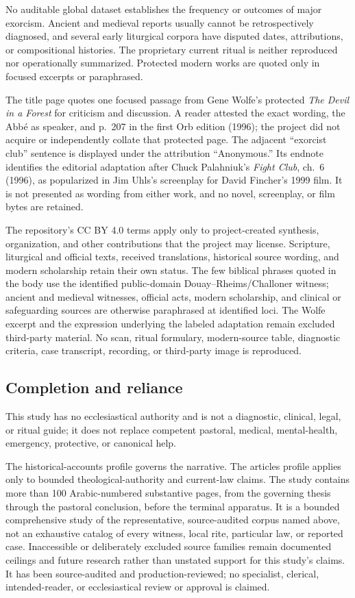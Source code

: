 No auditable global dataset establishes the frequency or outcomes of major
exorcism. Ancient and medieval reports usually cannot be retrospectively
diagnosed, and several early liturgical corpora have disputed dates,
attributions, or compositional histories. The proprietary current ritual is
neither reproduced nor operationally summarized. Protected modern works are
quoted only in focused excerpts or paraphrased.

The title page quotes one focused passage from Gene Wolfe's protected
\emph{The Devil in a Forest} for criticism and discussion. A reader attested
the exact wording, the Abbé as speaker, and p.~207 in the first Orb edition
(1996); the project did not acquire or independently collate that protected
page. The adjacent ``exorcist club'' sentence is displayed under the
attribution ``Anonymous.'' Its endnote identifies the editorial
adaptation after Chuck Palahniuk's \emph{Fight Club}, ch.~6 (1996), as
popularized in Jim Uhls's screenplay for David Fincher's 1999 film. It is not
presented as wording from either work, and no novel, screenplay, or film bytes
are retained.

The repository's CC BY 4.0 terms apply only to project-created synthesis,
organization, and other contributions that the project may license. Scripture,
liturgical and official texts, received translations, historical source
wording, and modern scholarship retain their own status. The few biblical
phrases quoted in the body use the identified public-domain
Douay--Rheims/Challoner witness; ancient and medieval witnesses, official
acts, modern scholarship, and clinical or safeguarding sources are otherwise
paraphrased at identified loci. The Wolfe excerpt and the expression underlying
the labeled adaptation remain excluded third-party material. No scan, ritual formulary, modern-source
table, diagnostic criteria, case transcript, recording, or third-party image
is reproduced.

\subsection{Completion and reliance}

This study has no ecclesiastical authority and is not a diagnostic, clinical,
legal, or ritual guide; it does not replace competent pastoral, medical,
mental-health, emergency, protective, or canonical help.

The historical-accounts profile governs the narrative. The articles profile
applies only to bounded theological-authority and current-law claims. The
study contains more than 100 Arabic-numbered substantive pages, from the
governing thesis through the pastoral conclusion, before the terminal
apparatus. It is a bounded comprehensive study of the representative,
source-audited corpus named above, not an exhaustive catalog of every witness,
local rite, particular law, or reported case. Inaccessible or deliberately
excluded source families remain documented ceilings and future research rather
than unstated support for this study's claims. It has been source-audited and
production-reviewed; no specialist, clerical, intended-reader, or
ecclesiastical review or approval is claimed.
